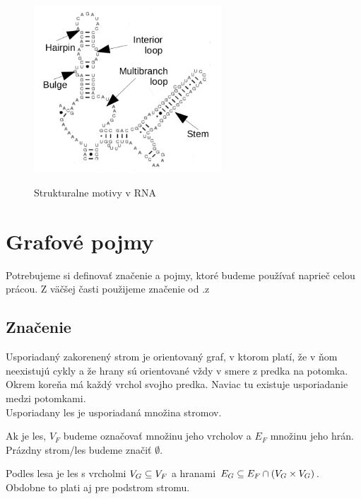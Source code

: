 
\begin{figure}[H]
\centering
\includegraphics[width=70mm, height=70mm]{../img/struktury_v_rna.png}
\caption{Strukturalne motivy v RNA}
\label{obr:RNA_motifs}
\end{figure}

\section{Grafové pojmy}

Potrebujeme si definovať značenie a pojmy, ktoré budeme používať naprieč celou prácou.
Z väčšej časti použijeme značenie od \citet{RTED}.z

\subsection{Značenie}

\begin{definice}\label{def:strom}
  Usporiadaný zakorenený strom je orientovaný graf, v ktorom platí, že v ňom neexistujú cykly
  a že hrany sú orientované vždy v smere z predka na potomka.
  Okrem koreňa má každý vrchol svojho predka. Naviac tu existuje usporiadanie medzi potomkami.
  \\
  Usporiadany les je usporiadaná množina stromov.
\end{definice}

Ak  je les, $V_F$ budeme označovať množinu jeho vrcholov a $E_F$ množinu jeho hrán.
Prázdny strom/les budeme značiť $\emptyset$.

Podles lesa  je les  s vrcholmi $V_{G} \subseteq V_{F}$
a hranami $E_{G} \subseteq E_{F} \cap (V_{G} \times V_{G})$.
Obdobne to plati aj pre podstrom stromu.

